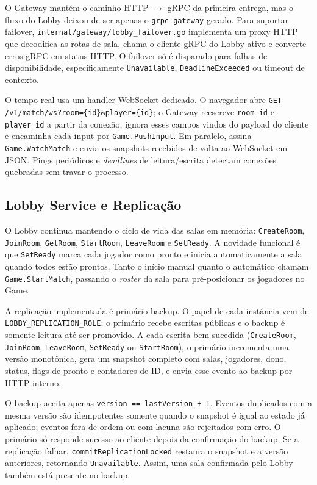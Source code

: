 \documentclass[portuguese]{sbcreviews-2025}%
\begin{document}
O Gateway mantém o caminho HTTP $\rightarrow$ gRPC da primeira entrega, mas o fluxo do Lobby deixou de ser apenas o \texttt{grpc-gateway} gerado. Para suportar failover, \texttt{internal/gateway/lobby\_failover.go} implementa um proxy HTTP que decodifica as rotas de sala, chama o cliente gRPC do Lobby ativo e converte erros gRPC em status HTTP. O failover só é disparado para falhas de disponibilidade, especificamente \texttt{Unavailable}, \texttt{DeadlineExceeded} ou timeout de contexto.

O tempo real usa um handler WebSocket dedicado. O navegador abre \texttt{GET /v1/match/ws?room=\{id\}\&player=\{id\}}; o Gateway reescreve \texttt{room\_id} e \texttt{player\_id} a partir da conexão, ignora esses campos vindos do payload do cliente e encaminha cada input por \texttt{Game.PushInput}. Em paralelo, assina \texttt{Game.WatchMatch} e envia os snapshots recebidos de volta ao WebSocket em JSON. Pings periódicos e \textit{deadlines} de leitura/escrita detectam conexões quebradas sem travar o processo.

\subsection{Lobby Service e Replicação}

O Lobby continua mantendo o ciclo de vida das salas em memória: \texttt{CreateRoom}, \texttt{JoinRoom}, \texttt{GetRoom}, \texttt{StartRoom}, \texttt{LeaveRoom} e \texttt{SetReady}. A novidade funcional é que \texttt{SetReady} marca cada jogador como pronto e inicia automaticamente a sala quando todos estão prontos. Tanto o início manual quanto o automático chamam \texttt{Game.StartMatch}, passando o \textit{roster} da sala para pré-posicionar os jogadores no Game.

A replicação implementada é primário-backup. O papel de cada instância vem de \texttt{LOBBY\_REPLICATION\_ROLE}; o primário recebe escritas públicas e o backup é somente leitura até ser promovido. A cada escrita bem-sucedida (\texttt{CreateRoom}, \texttt{JoinRoom}, \texttt{LeaveRoom}, \texttt{SetReady} ou \texttt{StartRoom}), o primário incrementa uma versão monotônica, gera um snapshot completo com salas, jogadores, dono, status, flags de pronto e contadores de ID, e envia esse evento ao backup por HTTP interno.

O backup aceita apenas \texttt{version == lastVersion + 1}. Eventos duplicados com a mesma versão são idempotentes somente quando o snapshot é igual ao estado já aplicado; eventos fora de ordem ou com lacuna são rejeitados com erro. O primário só responde sucesso ao cliente depois da confirmação do backup. Se a replicação falhar, \texttt{commitReplicationLocked} restaura o snapshot e a versão anteriores, retornando \texttt{Unavailable}. Assim, uma sala confirmada pelo Lobby também está presente no backup.
\end{document}
